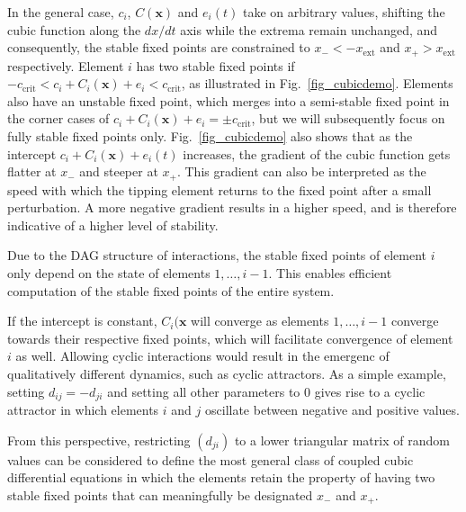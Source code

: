 \documentclass[conference]{IEEEtran}
\newcommand{\vectorsym}[1]{\ensuremath{\mathbf{#1}}}
\newcommand{\xextremum}{\ensuremath{x_{\mathrm{ext}}}}
\newcommand{\ccrit}{\ensuremath{c_{\mathrm{crit}}}}
\newcommand{\agentimpact}{\ensuremath{e}}
\begin{document}
In the general case, $c_i$, $C(\vectorsym{x})$ and $\agentimpact_i(t)$
take on arbitrary values, shifting the cubic function along the
$dx / dt$ axis while the extrema remain unchanged, and consequently,
the stable fixed points are constrained to $x_{-} < -\xextremum$ and
$x_{+} > \xextremum$ respectively. Element $i$ has two stable fixed
points if
$-\ccrit < c_i + C_i(\vectorsym{x}) + \agentimpact_i < \ccrit$, as
illustrated in Fig.~\ref{fig_cubicdemo}. Elements also have an
unstable fixed point, which merges into a semi-stable fixed point in
the corner cases of
$c_i + C_i(\vectorsym{x}) + \agentimpact_i = \pm \ccrit$, but we will
subsequently focus on fully stable fixed points only.
Fig.~\ref{fig_cubicdemo} also shows that as the intercept
$c_i + C_i(\vectorsym{x}) + \agentimpact_i(t)$ increases, the gradient
of the cubic function gets flatter at $x_{-}$ and steeper at $x_{+}$.
This gradient can also be interpreted as the speed with which the
tipping element returns to the fixed point after a small perturbation.
A more negative gradient results in a higher speed, and is therefore
indicative of a higher level of stability.

Due to the DAG structure of interactions, the stable fixed points of
element $i$ only depend on the state of elements $1, \ldots, i - 1$.
This enables efficient computation of the stable fixed points of the
entire system.

If the intercept is constant, $C_i(\vectorsym{x}$ will converge as
elements $1, \ldots, i - 1$ converge towards their respective fixed
points, which will facilitate convergence of element $i$ as well.
Allowing cyclic interactions would result in the emergenc of
qualitatively different dynamics, such as cyclic attractors. As a
simple example, setting $d_{ij} = -d_{ji}$ and setting all other
parameters to $0$ gives rise to a cyclic attractor in which elements
$i$ and $j$ oscillate between negative and positive values.

From this perspective, restricting $(d_{ji})$ to a lower triangular
matrix of random values can be considered to define the most general
class of coupled cubic differential equations in which the elements
retain the property of having two stable fixed points that can
meaningfully be designated $x_{-}$ and $x_{+}$.
\end{document}
